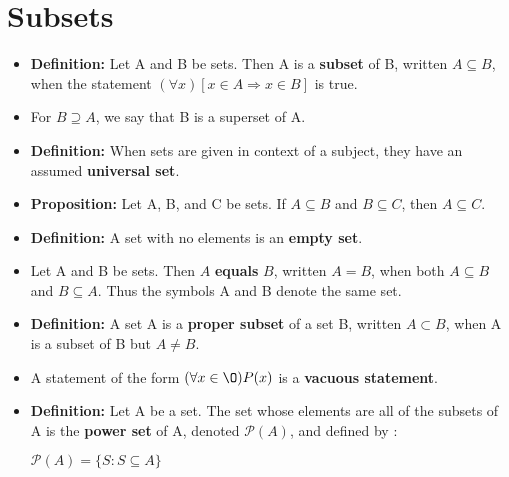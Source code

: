 \documentclass{report}
\begin{document}
	\section{Subsets}
		\begin{itemize}\addtolength{\leftskip}{2em}
			\item \textbf{Definition:} Let A and B be sets. Then A is a \textbf{subset} of B, written $A\subseteq B$, when the statement $(\forall x)[x\in A \Rightarrow x\in B]$ is true.
			\item For $B\supseteq A$, we say that B is a superset of A.
			\item \textbf{Definition:} When sets are given in context of a subject, they have an assumed \textbf{universal set}.
			\item \textbf{Proposition:} Let A, B, and C be sets. If $A\subseteq B$ and $B\subseteq C$, then $A\subseteq C$.
			\item \textbf{Definition:} A set with no elements is an \textbf{empty set}.
			\item Let A and B be sets. Then $A$ \textbf{equals} $B$, written $A=B$, when both $A\subseteq B$ and $B\subseteq A$. Thus the symbols A and B denote the same set.
			\item \textbf{Definition:} A set A is a \textbf{proper subset} of a set B, written $A\subset B$, when A is a subset of B but $A\ne B$.
			\item A statement of the form $(\forall x\in \O)P(x)$ is a \textbf{vacuous statement}.
			\item \textbf{Definition:} Let A be a set. The set whose elements are all of the subsets of A is the \textbf{power set} of A, denoted $\mathcal P(A)$, and defined by :
			\begin{center}
				$\mathcal{P}(A)=\{S:S\subseteq A\}$
			\end{center}
		\end{itemize}
\end{document}
